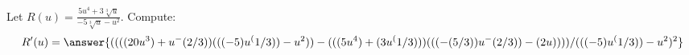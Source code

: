 \documentclass{ximera}
\begin{document}
\begin{exercise}
Let $R(u) = \frac{ 5 u^4+3 \sqrt[3]{u}}{-5 \sqrt[3]{u}-u^2}$. Compute:
\[
R'(u)
=\answer{ ((((20 u^3) + u^-(2/3)) (((-5) u^(1/3)) - u^2)) - (((5 u^4) + (3 u^(1/3))) (((-(5/3)) u^-(2/3)) - (2 u))))/(((-5) u^(1/3)) - u^2)^2 }
\]
\end{exercise}
\end{document}
